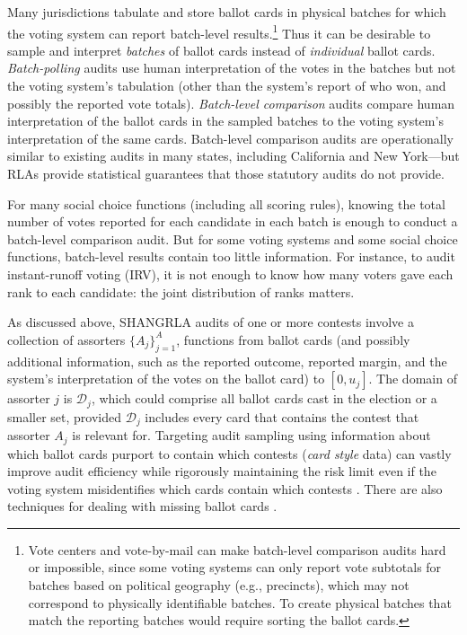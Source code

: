 \documentclass[aoas]{imsart}
\newcommand{\cD}{\ensuremath{\mathcal{D}}}
\begin{document}
Many jurisdictions tabulate and store ballot cards in physical batches for which the voting system
can report batch-level results.\footnote{%
Vote centers and vote-by-mail can make batch-level comparison audits hard or impossible,
since some voting systems can only report vote subtotals for batches based on political geography (e.g., precincts),
which may not correspond to physically identifiable batches.
To create physical batches that match the reporting batches would require sorting the ballot cards.
}
Thus it can be desirable to sample and interpret \emph{batches} of ballot cards instead of \emph{individual} ballot cards.
\emph{Batch-polling} audits use human interpretation of the votes in the batches but not the voting system's tabulation (other than the system's report of who won, and possibly the reported vote totals).
\emph{Batch-level comparison} audits compare human interpretation of the ballot cards in the sampled batches to the voting system's
interpretation of the same cards.
Batch-level comparison audits are operationally similar to existing audits in many states,
including California and New York---but RLAs provide statistical guarantees that those statutory audits do not
provide.

For many social choice functions (including all scoring rules), knowing the total number of votes
reported for each candidate in each batch is enough to conduct a batch-level comparison audit.
But for some voting systems and some social choice functions, batch-level results contain too little information.
For instance, to audit instant-runoff voting (IRV), it is not enough to know how many voters gave each rank to each candidate:
the joint distribution of ranks matters.

As discussed above, SHANGRLA audits of one or more contests involve a collection of assorters $\{A_j\}_{j=1}^A$,
functions from ballot cards (and possibly additional information, such as the reported outcome, reported margin,
and the system's interpretation of the votes on the ballot card) to $[0, u_j]$.
The domain of assorter $j$ is $\cD_j$, which could comprise all ballot cards cast in the election
or a smaller set, provided $\cD_j$ includes every card
that contains the contest that assorter $A_j$ is relevant for.
Targeting audit sampling using information about which ballot cards purport to contain which contests (\emph{card style} data)
can vastly improve audit efficiency while rigorously maintaining the risk limit even if the voting system misidentifies which
cards contain which contests \citep{glazerEtal21}.
There are also techniques for dealing with missing ballot cards \citep{banuelosStark12,stark20}.
\end{document}
